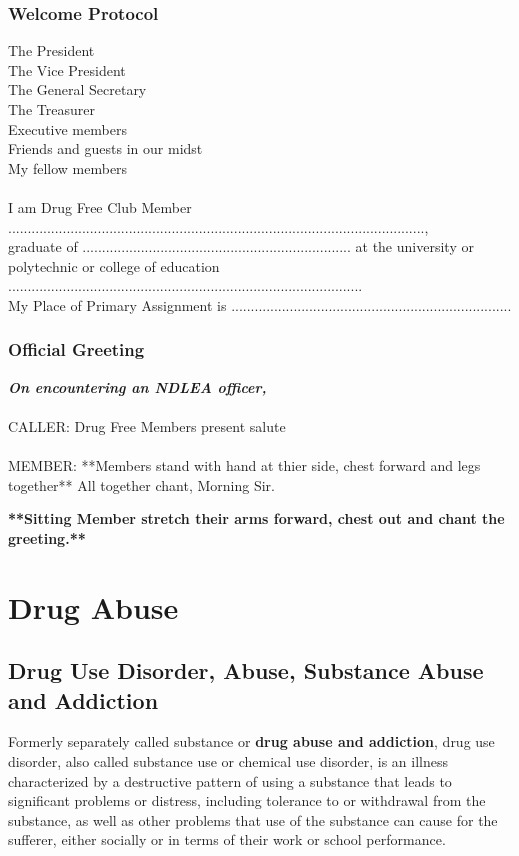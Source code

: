 \documentclass{report}
\begin{document}
\subsection{Welcome Protocol}
The President\\
The Vice President\\
The General Secretary\\
The Treasurer\\
Executive members\\
Friends and guests in our midst\\
My fellow members\\
\\
I am Drug Free Club Member ...........................................................................................................,\\ graduate of ..................................................................... at the university or polytechnic or college of education ...........................................................................................\\ My Place of Primary Assignment is ........................................................................

\subsection{Official Greeting}
\textit{\textbf{On encountering an NDLEA officer,}}\\
\\
CALLER: Drug Free Members present salute\\
\\
MEMBER: **Members stand with hand at thier side, chest forward and legs together** All together chant, Morning Sir.

\textbf{**Sitting Member stretch their arms forward, chest out and chant the greeting.**}

\chapter{Drug Abuse}
\section{Drug Use Disorder, Abuse, Substance Abuse and Addiction}

Formerly separately called substance or \textbf{drug abuse and addiction}, drug use disorder, also called substance use or chemical use disorder, is an illness characterized by a destructive pattern of using a substance that leads to significant problems or distress, including tolerance to or withdrawal from the substance, as well as other problems that use of the substance can cause for the sufferer, either socially or in terms of their work or school performance.
\end{document}
